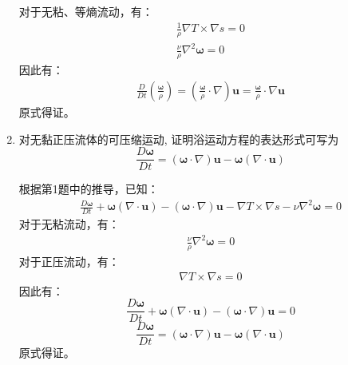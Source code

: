 \begin{enumerate}
        对于无粘、等熵流动，有：
        \begin{align}
            \frac{1}{\rho} \nabla T \times \nabla s = 0 \\
            \frac{\nu}{\rho} \nabla^{2} \boldsymbol{\omega} = 0
        \end{align}
        因此有：
        \begin{equation}
            \begin{aligned}
                \frac{D}{D t}\left(\frac{\boldsymbol{\omega}}{\rho}\right)
                = \left(\frac{\boldsymbol{\omega}}{\rho} \cdot \nabla\right) \mathbf{u}
                = \frac{\boldsymbol{\omega}}{\rho} \cdot \nabla \mathbf{u}
            \end{aligned}
        \end{equation}
        原式得证。


    \item 对无黏正压流体的可压缩运动, 证明浴运动方程的表达形式可写为
    \[
    \frac{D \boldsymbol{\omega}}{D t}
    =(\boldsymbol{\omega} \cdot \nabla) \mathbf{u}-\boldsymbol{\omega}(\nabla \cdot \mathbf{u})
    \]

        根据第1题中的推导，已知：
        \begin{equation}
            \begin{aligned}
                \frac{D \boldsymbol{\omega}}{D t}
                + \boldsymbol{\omega}(\nabla \cdot \mathbf{u})
                - (\boldsymbol{\omega} \cdot \nabla) \mathbf{u}
                - \nabla T \times \nabla s
                - \nu \nabla^{2} \boldsymbol{\omega}
                = 0
            \end{aligned}
        \end{equation}
        对于无粘流动，有：
        \begin{align}
            \frac{\nu}{\rho} \nabla^{2} \boldsymbol{\omega} = 0
        \end{align}
        对于正压流动，有：
        \begin{align}
            \nabla T \times \nabla s = 0
        \end{align}
        因此有：
        \begin{equation}
            \frac{D \boldsymbol{\omega}}{D t}
            + \boldsymbol{\omega}(\nabla \cdot \mathbf{u})
            - (\boldsymbol{\omega} \cdot \nabla) \mathbf{u}
            = 0
        \end{equation}
        \begin{equation}
            \frac{D \boldsymbol{\omega}}{D t}
            =(\boldsymbol{\omega} \cdot \nabla) \mathbf{u}-\boldsymbol{\omega}(\nabla \cdot \mathbf{u})        
        \end{equation}
        原式得证。
\end{enumerate}

\clearpage